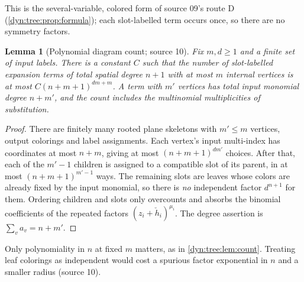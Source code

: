 \documentclass[11pt,letterpaper]{article}
\newtheorem{lemma}[lemma]{Lemma}
\theoremstyle{definition}
\theoremstyle{remark}
\numberwithin{equation}{section}
\begin{document}
This is the several-variable, colored form of source 09's route D
(\cref{dyn:tree:prop:formula}); each slot-labelled term occurs once, so
there are no symmetry factors.

\begin{lemma}[Polynomial diagram count; source 10]\label{dyn:nsc:lem:count}
Fix $m,d\ge1$ and a finite set of input labels. There is a constant $C$
such that the number of slot-labelled expansion terms of total spatial
degree $n+1$ with at most $m$ internal vertices is at most
$C(n+m+1)^{dm+m}$. A term with $m'$ vertices has total input monomial
degree $n+m'$, and the count includes the multinomial multiplicities of
substitution.
\end{lemma}
\begin{proof}
There are finitely many rooted plane skeletons with $m'\le m$ vertices,
output colorings and label assignments. Each vertex's input multi-index has
coordinates at most $n+m$, giving at most $(n+m+1)^{dm'}$ choices. After
that, each of the $m'-1$ children is assigned to a compatible slot of its
parent, in at most $(n+m+1)^{m'-1}$ ways. The remaining slots are leaves
whose colors are already fixed by the input monomial, so there is \emph{no}
independent factor $d^{n+1}$ for them. Ordering children and slots only
overcounts and absorbs the binomial coefficients of the repeated factors
$(z_i+\check h_i)^{\mu_i}$. The degree assertion is $\sum_va_v=n+m'$.
\end{proof}

Only polynomiality in $n$ at fixed $m$ matters, as in
\cref{dyn:tree:lem:count}. Treating leaf colorings as independent would
cost a spurious factor exponential in $n$ and a smaller radius (source 10).
\end{document}
